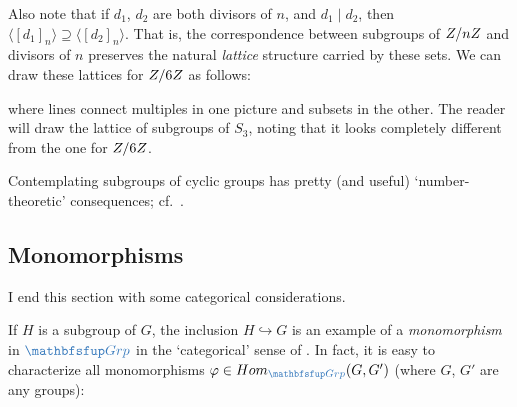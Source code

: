 Also note that if $d_1$, $d_2$ are both divisors of $n$, and
$d_1 \mid d_2$, then
$\langle [d_1]_n \rangle \supseteq \langle [d_2]_n \rangle$. That is,
the correspondence between subgroups of $Z/nZ$ and divisors of $n$
preserves the natural \emph{lattice} structure carried by these
sets. We can draw these lattices for $Z/6Z$ as follows:
\begin{center}
  \qquad\qquad
\end{center}
where lines connect multiples in one picture and subsets in the other.
The reader will draw the lattice of subgroups of $S_3$, noting that it
looks completely different from the one for $Z/6Z$.

Contemplating subgroups of cyclic groups has pretty (and useful)
`number-theoretic' consequences; cf.\
.

\subsection{Monomorphisms}
\label{subsec:groups:monomorphisms}
I end this section with some categorical considerations.

If $H$ is a subgroup of $G$, the inclusion $H \hookrightarrow G$ is an
example of a \emph{monomorphism} in $\categ{Grp}$ in the `categorical'
sense of
. In
fact, it is easy to characterize all monomorphisms
$\varphi \in \Hom_{\categ{Grp}}(G,G')$ (where $G$, $G'$ are any
groups):

